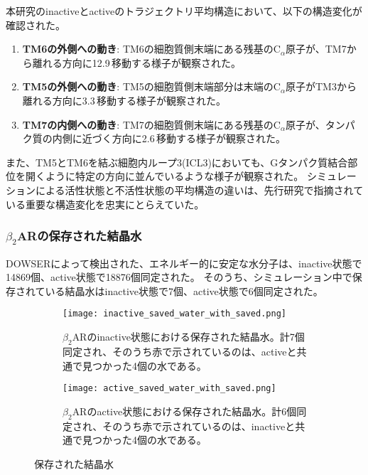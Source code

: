 \newpage

本研究のinactiveとactiveのトラジェクトリ平均構造において、以下の構造変化が確認された。
\begin{enumerate}
  \item \textbf{TM6の外側への動き}: TM6の細胞質側末端にある残基の$\mathrm{C}_\alpha$原子が、TM7から離れる方向に12.9\,\text{\AA}移動する様子が観察された。
  \item \textbf{TM5の外側への動き}: TM5の細胞質側末端部分は末端の$\mathrm{C}_\alpha$原子がTM3から離れる方向に3.3\,\text{\AA}移動する様子が観察された。
  \item \textbf{TM7の内側への動き}: TM7の細胞質側末端にある残基の$\mathrm{C}_\alpha$原子が、タンパク質の内側に近づく方向に2.6\,\text{\AA}移動する様子が観察された。
\end{enumerate}

また、TM5とTM6を結ぶ細胞内ループ3(ICL3)においても、Gタンパク質結合部位を開くように特定の方向に並んでいるような様子が観察された。
シミュレーションによる活性状態と不活性状態の平均構造の違いは、先行研究で指摘されている重要な構造変化を忠実にとらえていた。

\subsubsection{$\beta_2$ARの保存された結晶水}
DOWSERによって検出された、エネルギー的に安定な水分子は、inactive状態で14869個、active状態で18876個同定された。
そのうち、シミュレーション中で保存されている結晶水はinactive状態で7個、active状態で6個同定された。

\begin{figure}[htbp]
    \centering
    \begin{subfigure}{0.48\textwidth} %
      \centering
      \texttt{[image: inactive\_saved\_water\_with\_saved.png]}
      \caption{$\beta_2$ARのinactive状態における保存された結晶水。計7個同定され、そのうち赤で示されているのは、activeと共通で見つかった4個の水である。}
      \label{fig:inactive_water}
    \end{subfigure}
    \hspace{0.02\textwidth} %
    \begin{subfigure}{0.48\textwidth}
      \centering
      \texttt{[image: active\_saved\_water\_with\_saved.png]}
      \caption{$\beta_2$ARのactive状態における保存された結晶水。計6個同定され、そのうち赤で示されているのは、inactiveと共通で見つかった4個の水である。}
      \label{fig:active_water}
    \end{subfigure}
    \caption{保存された結晶水}
    \label{fig:water-all}
  \end{figure}

